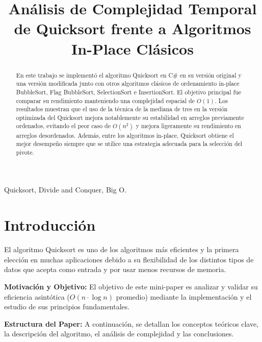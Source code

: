 \documentclass[conference]{IEEEtran}
\begin{document}
\title{Análisis de Complejidad Temporal de Quicksort frente a Algoritmos In-Place Clásicos}

\author{
}

\maketitle

\begin{abstract}
En este trabajo se implementó el algoritmo Quicksort en C\# en su versión original y una versión modificada junto con otros algoritmos clásicos de ordenamiento in-place BubbleSort, Flag BubbleSort, SelectionSort e InsertionSort.
El objetivo principal fue comparar su rendimiento manteniendo una complejidad espacial de $O(1)$.
Los resultados muestran que  el uso de la técnica de la mediana de tres en la versión optimizada del Quicksort mejora notablemente su estabilidad en arreglos previamente ordenados, evitando el peor caso de $O(n^2)$ y mejora ligeramente su rendimiento en arreglos desordenados.
Además, entre los algoritmos in-place, Quicksort obtiene el mejor desempeño siempre que se utilice una estrategia adecuada para la selección del pivote.
\end{abstract}

\begin{IEEEkeywords}
Quicksort, Divide and Conquer, Big O.
\end{IEEEkeywords}


\section{Introducción}

El algoritmo Quicksort es uno de los algoritmos más eficientes y la 
primera elección en muchas aplicaciones debido a su flexibilidad de los distintos tipos de datos que acepta como entrada y por usar menos recursos de memoria.\par
\textbf{Motivación y Objetivo:} El objetivo de este mini-paper es analizar y validar su eficiencia asintótica ($O(n\cdot \log{n})$ promedio) mediante la implementación y el estudio de sus principios fundamentales.\par   
\textbf{Estructura del Paper:} A continuación, se detallan los conceptos teóricos clave, la descripción del algoritmo, el análisis de complejidad y las conclusiones.
\end{document}
